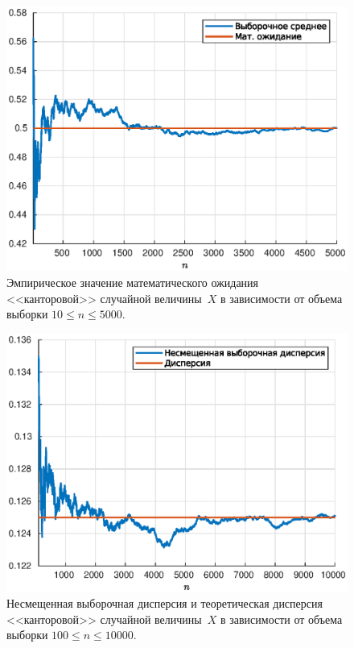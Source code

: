 \begin{figure}[b]
        \includegraphics[width=\linewidth]{task_02/expectes10-5000.eps}
        \caption{Эмпирическое значение математического ожидания <<канторовой>> случайной величины~$X$ в зависимости от объема выборки $10\leqslant n \leqslant 5000$.}
\end{figure}
\begin{figure}[t]
        \includegraphics[width=\linewidth]{task_02/var100-10000.eps}
        \caption{Несмещенная выборочная дисперсия и теоретическая дисперсия <<канторовой>> случайной величины~$X$ в зависимости от объема выборки $100\leqslant n \leqslant 10000$.}
\end{figure}
